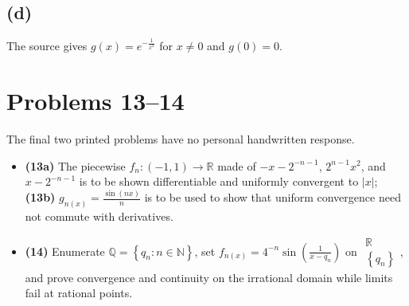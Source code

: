 \subsection{(d)}

The source gives \(g(x) = e^{- \frac{1}{x^{2}}}\) for \(x \neq 0\) and \(g(0) = 0\).

\section{Problems 13--14}

The final two printed problems have no personal handwritten response.

\begin{itemize}
\tightlist
\item
  \textbf{(13a)} The piecewise \(f_{n}:\left( {- 1,1} \right)\rightarrow\mathbb{R}\) made of \(- x - 2^{- n - 1}\), \(2^{n - 1}x^{2}\), and \(x - 2^{- n - 1}\) is to be shown differentiable and uniformly convergent to \(|x|\); \textbf{(13b)} \(g_{n{(x)}} = \frac{\sin\left( {nx} \right)}{n}\) is to be used to show that uniform convergence need not commute with derivatives.
\item
  \textbf{(14)} Enumerate \(\mathbb{Q} = \left\{ {q_{n}:n \in \mathbb{N}} \right\}\), set \(f_{n{(x)}} = 4^{- n}\sin\left( \frac{1}{x - q_{n}} \right)\) on \(\begin{matrix}
  \mathbb{R} \\
  \left\{ q_{n} \right\}
  \end{matrix}\), and prove convergence and continuity on the irrational domain while limits fail at rational points.
\end{itemize}
